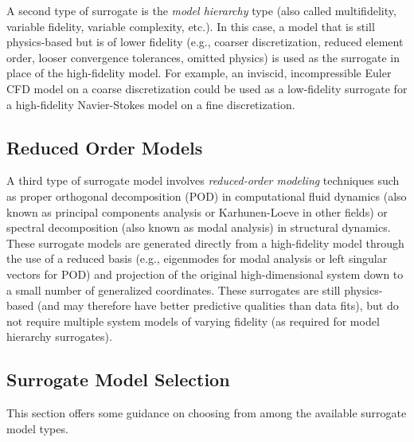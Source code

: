A second type of surrogate is the {\em model hierarchy} type (also
called multifidelity, variable fidelity, variable complexity, etc.).
In this case, a model that is still physics-based but is of lower
fidelity (e.g., coarser discretization, reduced element order, looser
convergence tolerances, omitted physics) is used as the surrogate in
place of the high-fidelity model.  For example, an inviscid,
incompressible Euler CFD model on a coarse discretization could be
used as a low-fidelity surrogate for a high-fidelity Navier-Stokes
model on a fine discretization.

\subsection{Reduced Order Models} \label{models:surrogate:rom}

A third type of surrogate model involves {\em reduced-order modeling}
techniques such as proper orthogonal decomposition (POD) in
computational fluid dynamics (also known as principal components
analysis or Karhunen-Loeve in other fields) or spectral decomposition
(also known as modal analysis) in structural dynamics.  These
surrogate models are generated directly from a high-fidelity model
through the use of a reduced basis (e.g., eigenmodes for modal
analysis or left singular vectors for POD) and projection of the
original high-dimensional system down to a small number of generalized
coordinates.  These surrogates are still physics-based (and may
therefore have better predictive qualities than data fits), but do not
require multiple system models of varying fidelity (as required for
model hierarchy surrogates).

\subsection{Surrogate Model Selection}

This section offers some guidance on choosing from among the available
surrogate model types.

